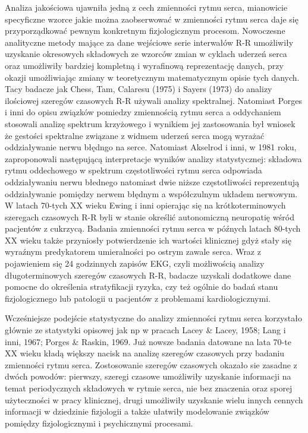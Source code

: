 Analiza jakościowa ujawniła jedną z cech zmienności rytmu serca, mianowicie specyficzne
wzorce jakie można zaobserwować w zmienności rytmu serca daje się przyporządkować
pewnym konkretnym fizjologicznym procesom. Nowoczesne analityczne metody mające za dane
wejściowe serie interwałów R-R umożliwiły uzyskanie okresowych składowych ze wzorców
zmian w cyklach uderzeń serca oraz umożliwiły bardziej kompletną i wyrafinową
reprezentację danych, przy okazji umożliwiając zmiany w teoretycznym matematycznym
opisie tych danych. Tacy badacze jak Chess, Tam, Calaresu (1975) i Sayers (1973) do analizy
ilościowej szeregów czasowych R-R używali analizy spektralnej. Natomiast Porges i inni
do opisu związków pomiedzy zmiennością rytmu serca a oddychaniem stosowali analizę
spektrum krzyżowego i wynikiem jej zastosowania był wniosek że gestości spektralne
związane z widmem uderzeń serca mogą wyrażać oddziaływanie nerwu błędngo na serce.
Natomiast Akselrod i inni, w 1981 roku, zaproponowali następującą interpretacje
wyników analizy statystycznej: składowa rytmu oddechowego w spektrum częstotliwości
rytmu serca odpowiada oddziaływaniu nerwu błednego natomiast dwie niższe
częstotliwości reprezentują oddziaływanie pomiędzy nerwem błędnym a współczulnym
układem nerwowym. W latach 70-tych XX wieku Ewing i inni opierając się na
krótkoterminowych szeregach czasowych R-R byli w stanie określić autonomiczną
neuropatię wśród pacjentów z cukrzycą. Badania zmienności rytmu serca w późnych
latach 80-tych XX wieku także przyniosły potwierdzenie ich wartości klinicznej gdyż
stały się wyraźnym predykatorem umieralności po ostrym zawale serca. Wraz z pojawieniem
się 24 godzinnych zapisów EKG, czyli możliwością analizy długoterminowych szeregów
czasowych R-R, badacze uzyskali dodatkowe dane pomocne do określenia stratyfikacji ryzyka,
czy też ogólnie do badań stanu fizjologicznego lub patologii u pacjentów z problemami
kardiologicznymi.

Wcześniejsze podejście statystyczne do analizy zmienności rytmu serca korzystało
głównie ze statystyki opisowej jak np w pracach Lacey \& Lacey, 1958; Lang i inni, 1967;
Porges \& Raskin, 1969. Już nowsze badania datowane na lata 70-te XX wieku kładą
większy nacisk na analizę szeregów czasowych przy badaniu zmienności rytmu serca.
Zostosowanie szeregów czasowych okazało sie zasadne z dwóch powodów: pierwszy, szeregi
czasowe umożliwiły uzyskanie informacji na temat periodycznych składowych w rytmie
serca, nie bez znaczenia oraz sporej użyteczności w pracy klinicznej, drugi umożliwiły
uzyskanie wielu innych cennych informacji w dziedzinie fizjologii a także ułatwiły
modelowanie związków pomiędzy fizjologicznymi i psychicznymi procesami.
